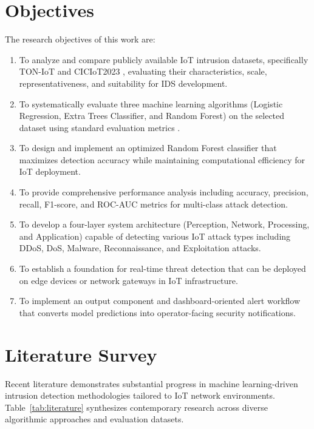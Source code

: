 \documentclass[conference]{IEEEtran}
\begin{document}
\section{Objectives}

The research objectives of this work are:

\begin{enumerate}
\item To analyze and compare publicly available IoT intrusion datasets, specifically TON-IoT and CICIoT2023 \cite{b8, b19}, evaluating their characteristics, scale, representativeness, and suitability for IDS development.

\item To systematically evaluate three machine learning algorithms (Logistic Regression, Extra Trees Classifier, and Random Forest) \cite{b21} on the selected dataset using standard evaluation metrics \cite{b23}.

\item To design and implement an optimized Random Forest classifier that maximizes detection accuracy while maintaining computational efficiency \cite{b21} for IoT deployment.

\item To provide comprehensive performance analysis including accuracy, precision, recall, F1-score, and ROC-AUC metrics \cite{b23} for multi-class attack detection.

\item To develop a four-layer system architecture (Perception, Network, Processing, and Application) \cite{b1, b3} capable of detecting various IoT attack types including DDoS, DoS, Malware, Reconnaissance, and Exploitation attacks.

\item To establish a foundation for real-time threat detection that can be deployed on edge devices \cite{b2, b14} or network gateways in IoT infrastructure.

\item To implement an output component and dashboard-oriented alert workflow \cite{b3} that converts model predictions into operator-facing security notifications.
\end{enumerate}

\section{Literature Survey}

Recent literature demonstrates substantial progress in machine learning-driven intrusion detection methodologies tailored to IoT network environments. Table~\ref{tab:literature} synthesizes contemporary research across diverse algorithmic approaches and evaluation datasets.
\end{document}
